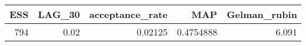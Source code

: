 \begin{longtable}{rrrrr}
\toprule
ESS & LAG\_30 & acceptance\_rate & MAP & Gelman\_rubin \\ 
\midrule
794 & 0.02 & 0.02125 & 0.4754888 & 6.091 \\ 
\bottomrule
\end{longtable}

